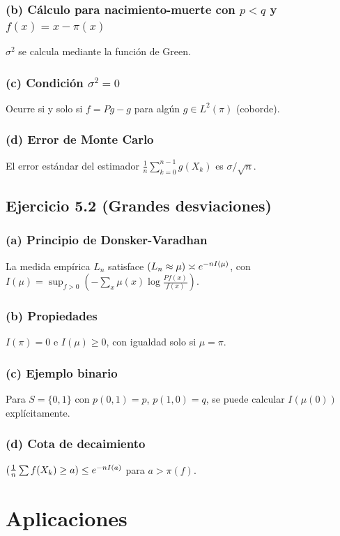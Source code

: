 \documentclass[12pt]{article}
\let\P\relax
\newcommand{\P}{\mathbb{P}}
\newcommand{\1}{\mathbf{1}}
\begin{document}
\subsubsection*{(b) C\'alculo para nacimiento-muerte con $p<q$ y $f(x)=x-\pi(x)$}
$\sigma^2$ se calcula mediante la funci\'on de Green.

\subsubsection*{(c) Condici\'on $\sigma^2=0$}
Ocurre si y solo si $f=Pg-g$ para alg\'un $g\in L^2(\pi)$ (coborde).

\subsubsection*{(d) Error de Monte Carlo}
El error est\'andar del estimador $\frac1n\sum_{k=0}^{n-1}g(X_k)$ es $\sigma/\sqrt{n}$.

\subsection{Ejercicio 5.2 (Grandes desviaciones)}

\subsubsection*{(a) Principio de Donsker-Varadhan}
La medida emp\'irica $L_n$ satisface $\P(L_n\approx\mu)\asymp e^{-nI(\mu)}$, con $I(\mu)=\sup_{f>0}\left(-\sum_x\mu(x)\log\frac{Pf(x)}{f(x)}\right)$.

\subsubsection*{(b) Propiedades}
$I(\pi)=0$ e $I(\mu)\ge0$, con igualdad solo si $\mu=\pi$.

\subsubsection*{(c) Ejemplo binario}
Para $S=\{0,1\}$ con $p(0,1)=p$, $p(1,0)=q$, se puede calcular $I(\mu(0))$ expl\'icitamente.

\subsubsection*{(d) Cota de decaimiento}
$\P(\frac1n\sum f(X_k)\ge a)\le e^{-n I(a)}$ para $a>\pi(f)$.

\section{Aplicaciones}
\end{document}

